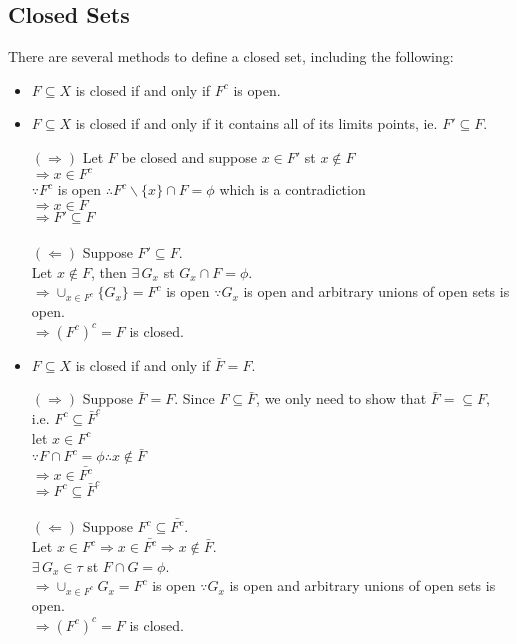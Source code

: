 \documentclass{article}
\begin{document}
\subsection{Closed Sets}

There are several methods to define a closed set, including the following:
\begin{itemize}
	\item $F \subseteq X$ is closed if and only if $F^c$ is open.
	\item $F \subseteq X$ is closed if and only if it contains all of its limits points, ie. $F' \subseteq F$.
	\begin{tcolorbox}[colback=lightgray!10,colframe=lightgray!10, fontupper=\linespread{1.5}\selectfont]
		$(\Rightarrow)$ Let $F$ be closed and suppose $x \in F'$ st $x \not\in F$ \\
		$\Rightarrow x \in F^c$ \\
		$\because F^c$ is open $\therefore F^c\backslash\{x\}\cap F = \phi$ which is a contradiction \\
		$\Rightarrow x \in F$ \\
		$\Rightarrow F' \subseteq F$ \\\\
		$(\Leftarrow)$ Suppose $F' \subseteq F$. \\
		Let $x \not\in F$, then $\exists \, G_x$ st $G_x \cap F = \phi$. \\
		$\Rightarrow \cup_{x\in F^c} \{G_x\} = F^c$ is open $\because G_x$ is open and arbitrary unions of open sets is open. \\
		$\Rightarrow (F^c)^c = F$ is closed.
	\end{tcolorbox}
	\item $F \subseteq X$ is closed if and only if $\bar{F} = F$.
	\begin{tcolorbox}[colback=lightgray!10,colframe=lightgray!10, fontupper=\linespread{1.5}\selectfont]
		$(\Rightarrow)$ Suppose $\bar{F} = F$. Since $F \subseteq \bar{F}$, we only need to show that $\bar{F} =\subseteq F$, i.e. $F^c \subseteq \bar{F}^c$ \\
		let $x \in F^c$ \\
		$\because F \cap F^c = \phi \therefore x \not\in \bar{F}$  \\
		$\Rightarrow x \in \bar{F^c}$ \\
		$\Rightarrow F^c \subseteq \bar{F}^c$ \\\\
		$(\Leftarrow)$ Suppose $F^c \subseteq \bar{F^c}$. \\
		Let $x \in F^c \Rightarrow x \in \bar{F^c} \Rightarrow x \not\in \bar{F}$. \\
		$\exists \, G_x \in \tau$ st $F\cap G = \phi$. \\
		$\Rightarrow \cup_{x\in F^c}G_x = F^c$ is open $\because G_x$ is open and arbitrary unions of open sets is open. \\
		$\Rightarrow (F^c)^c = F$ is closed.
	\end{tcolorbox}
\end{itemize}
\end{document}
